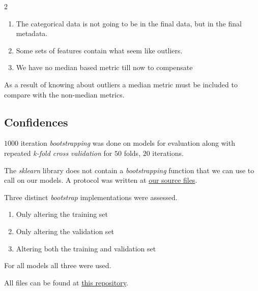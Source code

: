 \documentclass[12pt, a4paper]{article}
\begin{document}
\begin{multicols}{2}
    \begin{enumerate} \label{enm:metricReasons}
        \item The categorical data is not going to be in the final data, but in the final metadata.
        \item Some sets of features contain what seem like outliers.
        \item We have no median based metric till now to compensate
    \end{enumerate}

    As a result of knowing about outliers a median metric must be included to compare with the non-median metrics.
    \newline

    \subsection{Confidences} \label{subsec:conf}

    $1000$ iteration \textit{bootstrapping} was done on models for evaluation along with repeated \textit{k-fold cross validation} for $50$ folds, $20$ iterations.
    \newline

    The \textit{sklearn} library \cite{noauthor_scikit-learn_nodate} does not contain a \textit{bootstrapping} function that we can use to call on our models. A protocol was written at \href{https://github.com/ArisPodotas/Assignment-1-MLICB/blob/main/src/functions.py}{our source files}.
    \newline

    Three distinct \textit{bootstrap} implementations were assessed.
    \newline

    \begin{enumerate} \label{enm:bootstrap}
        \item Only altering the training set
        \item Only altering the validation set
        \item Altering both the training and validation set
    \end{enumerate}

    For all models all three were used.
    \newline

    All files can be found at \href{https://github.com/ArisPodotas/Assignment-1-MLICB/tree/main}{this repository}.
    \newline


\end{multicols}
\end{document}
